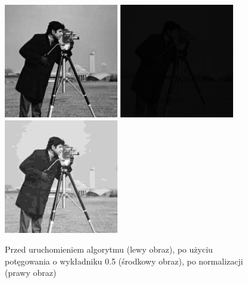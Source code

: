\documentclass[a4paper,12pt]{book}
\begin{document}
\begin{figure}[H]
	\caption{Przed uruchomieniem algorytmu (lewy obraz), po użyciu potęgowania o wykładniku 0.5 (środkowy obraz), po normalizacji (prawy obraz)}
	\includegraphics[width=5cm, height=5cm]{man-unmodified.jpg}
	\includegraphics[width=5cm, height=5cm]{2-4/power-gray-photoman-5.png}
	\includegraphics[width=5cm, height=5cm]{2-4/power-gray-photoman-5-norm.png}
\end{figure}
\end{document}
